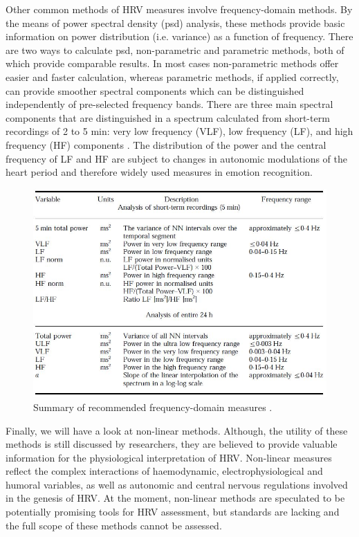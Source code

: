 Other common methods of HRV measures involve frequency-domain methods. By the means of power spectral density (\gls{psd}) analysis, these methods provide basic information on power distribution (i.e. variance) as a function of frequency. There are two ways to calculate \gls{psd}, non-parametric and parametric methods, both of which provide comparable results. In most cases non-parametric methods offer easier and faster calculation, whereas parametric methods, if applied correctly, can provide smoother spectral components which can be distinguished independently of pre-selected frequency bands. There are three main spectral components that are distinguished in a spectrum calculated from short-term
recordings of 2 to 5 min: very low frequency (VLF), low frequency (LF), and high frequency (HF) components \cite{TheEuropeanSocietyofCardiology1996}. The distribution of the power and the central frequency of LF and HF are subject to changes in autonomic modulations of the heart period and therefore widely used measures in emotion recognition. 
\begin{figure}[h!]
	\centering
  \includegraphics[width=1.0\textwidth, angle=0]{images/SelectedFrequencyDomainMeasures.jpg}
	\caption[HRV Frequency-Domain Measures Recommendation]{Summary of recommended frequency-domain measures \cite{TheEuropeanSocietyofCardiology1996}. }
	\label{tdf}
\end{figure}
Finally, we will have a look at non-linear methods. Although, the utility of these methods is still discussed by researchers, they are believed to provide valuable information for the physiological interpretation of HRV. Non-linear measures reflect the complex interactions of haemodynamic, electrophysiological and humoral variables, as well as autonomic and central
nervous regulations involved in the genesis of HRV. At the moment, non-linear methods are speculated to be potentially promising tools for HRV assessment, but standards are lacking and the full scope of these methods cannot be assessed.

